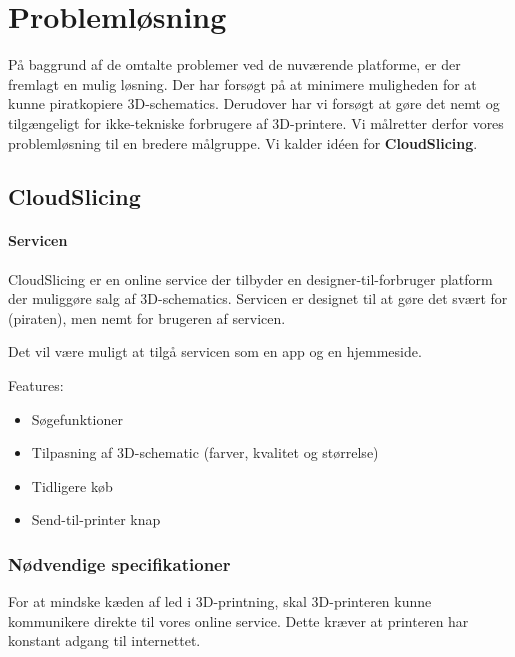 \chapter{Problemløsning} %
\label{cha:probleml_sning}


På baggrund af de omtalte problemer ved de nuværende platforme, er der fremlagt en mulig løsning. Der har forsøgt på at minimere muligheden for at kunne piratkopiere 3D-schematics. Derudover har vi forsøgt at gøre det nemt og tilgængeligt for ikke-tekniske forbrugere af 3D-printere. Vi målretter derfor vores problemløsning til en bredere målgruppe. Vi kalder idéen for \textbf{CloudSlicing}. 

\section{CloudSlicing} %
\label{sec:cloudslicing}

\subsubsection{Servicen} %
\label{ssub:servicen}

CloudSlicing er en online service der tilbyder en designer-til-forbruger platform der muliggøre salg af 3D-schematics. Servicen er designet til at gøre det svært for (piraten), men nemt for brugeren af servicen.

Det vil være muligt at tilgå servicen som en app og en hjemmeside.

Features:
\begin{itemize}
	\item Søgefunktioner
	\item Tilpasning af 3D-schematic (farver, kvalitet og størrelse)
	\item Tidligere køb
	\item Send-til-printer knap
\end{itemize}




\subsection{Nødvendige specifikationer} %
\label{sub:krav_til_3d_teknologien}

For at mindske kæden af led i 3D-printning, skal 3D-printeren kunne kommunikere direkte til vores online service. Dette kræver at printeren har konstant adgang til internettet.

